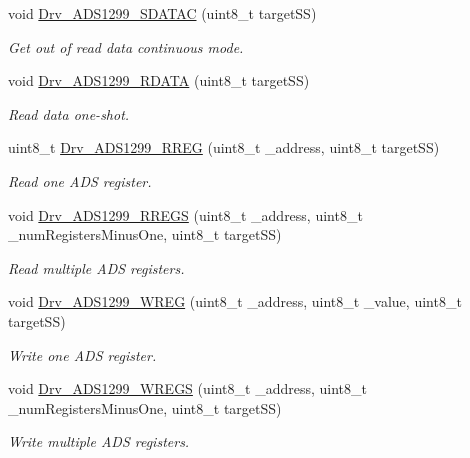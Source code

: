 \begin{DoxyCompactItemize}
void \hyperlink{group___a_d_s1299___library_ga9715d3a40b02158b668d9c82bd0af79a}{Drv\+\_\+\+A\+D\+S1299\+\_\+\+S\+D\+A\+T\+A\+C} (uint8\+\_\+t target\+S\+S)
\begin{DoxyCompactList}\small\item\em Get out of read data continuous mode. \end{DoxyCompactList}\item 
void \hyperlink{group___a_d_s1299___library_ga722cebf27d20f3d52ac205c1de4c9c89}{Drv\+\_\+\+A\+D\+S1299\+\_\+\+R\+D\+A\+T\+A} (uint8\+\_\+t target\+S\+S)
\begin{DoxyCompactList}\small\item\em Read data one-\/shot. \end{DoxyCompactList}\item 
uint8\+\_\+t \hyperlink{group___a_d_s1299___library_ga1c03d79e9a6080ed2de6916b1dd47849}{Drv\+\_\+\+A\+D\+S1299\+\_\+\+R\+R\+E\+G} (uint8\+\_\+t \+\_\+address, uint8\+\_\+t target\+S\+S)
\begin{DoxyCompactList}\small\item\em Read one A\+D\+S register. \end{DoxyCompactList}\item 
void \hyperlink{group___a_d_s1299___library_gae5ee6c66ba40e661985018da02f4683d}{Drv\+\_\+\+A\+D\+S1299\+\_\+\+R\+R\+E\+G\+S} (uint8\+\_\+t \+\_\+address, uint8\+\_\+t \+\_\+num\+Registers\+Minus\+One, uint8\+\_\+t target\+S\+S)
\begin{DoxyCompactList}\small\item\em Read multiple A\+D\+S registers. \end{DoxyCompactList}\item 
void \hyperlink{group___a_d_s1299___library_gaeb3dbf8ae39e90411b32757240f61b8b}{Drv\+\_\+\+A\+D\+S1299\+\_\+\+W\+R\+E\+G} (uint8\+\_\+t \+\_\+address, uint8\+\_\+t \+\_\+value, uint8\+\_\+t target\+S\+S)
\begin{DoxyCompactList}\small\item\em Write one A\+D\+S register. \end{DoxyCompactList}\item 
void \hyperlink{group___a_d_s1299___library_gac0ee4d97d673cfedde936fb9d81e8c5d}{Drv\+\_\+\+A\+D\+S1299\+\_\+\+W\+R\+E\+G\+S} (uint8\+\_\+t \+\_\+address, uint8\+\_\+t \+\_\+num\+Registers\+Minus\+One, uint8\+\_\+t target\+S\+S)
\begin{DoxyCompactList}\small\item\em Write multiple A\+D\+S registers. \end{DoxyCompactList}\item 

\end{DoxyCompactItemize}
